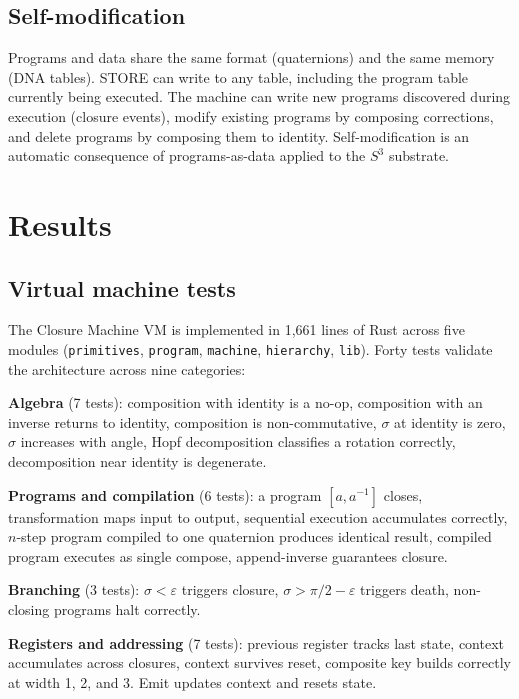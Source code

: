 \documentclass[12pt,a4paper]{article}
\begin{document}
\subsection{Self-modification}

Programs and data share the same format (quaternions) and the same memory (DNA tables). STORE can write to any table, including the program table currently being executed. The machine can write new programs discovered during execution (closure events), modify existing programs by composing corrections, and delete programs by composing them to identity. Self-modification is an automatic consequence of programs-as-data applied to the $S^3$ substrate.


\section{Results}

\subsection{Virtual machine tests}

The Closure Machine VM is implemented in 1,661 lines of Rust across five modules (\texttt{primitives}, \texttt{program}, \texttt{machine}, \texttt{hierarchy}, \texttt{lib}). Forty tests validate the architecture across nine categories:

\textbf{Algebra} (7 tests): composition with identity is a no-op, composition with an inverse returns to identity, composition is non-commutative, $\sigma$ at identity is zero, $\sigma$ increases with angle, Hopf decomposition classifies a rotation correctly, decomposition near identity is degenerate.

\textbf{Programs and compilation} (6 tests): a program $[a, a^{-1}]$ closes, transformation maps input to output, sequential execution accumulates correctly, $n$-step program compiled to one quaternion produces identical result, compiled program executes as single compose, append-inverse guarantees closure.

\textbf{Branching} (3 tests): $\sigma < \varepsilon$ triggers closure, $\sigma > \pi/2 - \varepsilon$ triggers death, non-closing programs halt correctly.

\textbf{Registers and addressing} (7 tests): previous register tracks last state, context accumulates across closures, context survives reset, composite key builds correctly at width 1, 2, and 3. Emit updates context and resets state.
\end{document}
